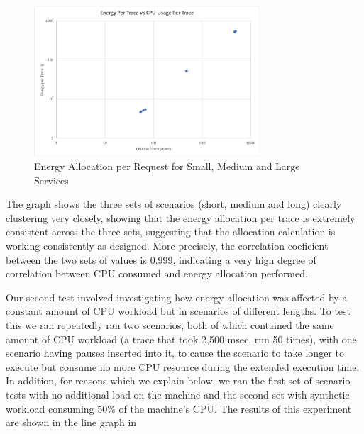 \begin{figure}
\centering
\includegraphics[width=0.75\textwidth]{Figures/validation-energycpu}
\caption{Energy Allocation per Request for Small, Medium and Large Services}
\label{figure:validation-energycpu}
\end{figure}

The graph shows the three sets of scenarios (short, medium and long) clearly clustering very closely, showing that the energy allocation per trace is extremely consistent across the three sets, suggesting that the allocation calculation is working consistently as designed.  More precisely, the correlation coeficient between the two sets of values is 0.999, indicating a very high degree of correlation between CPU consumed and energy allocation performed.

Our second test involved investigating how energy allocation was affected by a constant amount of CPU workload but in scenarios of different lengths.  To test this we ran repeatedly ran two scenarios, both of which contained the same amount of CPU workload (a trace that took 2,500 msec, run 50 times), with one scenario having pauses inserted into it, to cause the scenario to take longer to execute but consume no more CPU resource during the extended execution time.  In addition, for reasons which we explain below, we ran the first set of scenario tests with no additional load on the machine and the second set with synthetic workload consuming 50\% of the machine's CPU.  The results of this experiment are shown in the line graph in 

